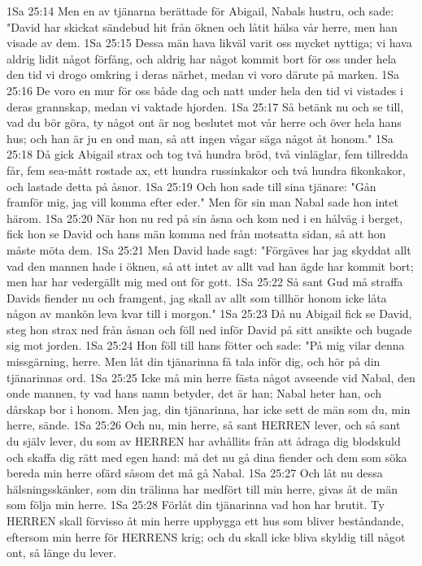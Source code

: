 1Sa 25:14  Men en av tjänarna berättade för Abigail, Nabals hustru, och sade: "David har skickat sändebud hit från öknen och låtit hälsa vår herre, men han visade av dem.
1Sa 25:15  Dessa män hava likväl varit oss mycket nyttiga; vi hava aldrig lidit något förfång, och aldrig har något kommit bort för oss under hela den tid vi drogo omkring i deras närhet, medan vi voro därute på marken.
1Sa 25:16  De voro en mur för oss både dag och natt under hela den tid vi vistades i deras grannskap, medan vi vaktade hjorden.
1Sa 25:17  Så betänk nu och se till, vad du bör göra, ty något ont är nog beslutet mot vår herre och över hela hans hus; och han är ju en ond man, så att ingen vågar säga något åt honom."
1Sa 25:18  Då gick Abigail strax och tog två hundra bröd, två vinläglar, fem tillredda får, fem sea-mått rostade ax, ett hundra russinkakor och två hundra fikonkakor, och lastade detta på åsnor.
1Sa 25:19  Och hon sade till sina tjänare: "Gån framför mig, jag vill komma efter eder." Men för sin man Nabal sade hon intet härom.
1Sa 25:20  När hon nu red på sin åsna och kom ned i en hålväg i berget, fick hon se David och hans män komma ned från motsatta sidan, så att hon måste möta dem.
1Sa 25:21  Men David hade sagt: "Förgäves har jag skyddat allt vad den mannen hade i öknen, så att intet av allt vad han ägde har kommit bort; men har har vedergällt mig med ont för gott.
1Sa 25:22  Så sant Gud må straffa Davids fiender nu och framgent, jag skall av allt som tillhör honom icke låta någon av mankön leva kvar till i morgon."
1Sa 25:23  Då nu Abigail fick se David, steg hon strax ned från åsnan och föll ned inför David på sitt ansikte och bugade sig mot jorden.
1Sa 25:24  Hon föll till hans fötter och sade: "På mig vilar denna missgärning, herre. Men låt din tjänarinna få tala inför dig, och hör på din tjänarinnas ord.
1Sa 25:25  Icke må min herre fästa något avseende vid Nabal, den onde mannen, ty vad hans namn betyder, det är han; Nabal heter han, och dårskap bor i honom. Men jag, din tjänarinna, har icke sett de män som du, min herre, sände.
1Sa 25:26  Och nu, min herre, så sant HERREN lever, och så sant du själv lever, du som av HERREN har avhållits från att ådraga dig blodskuld och skaffa dig rätt med egen hand: må det nu gå dina fiender och dem som söka bereda min herre ofärd såsom det må gå Nabal.
1Sa 25:27  Och låt nu dessa hälsningsskänker, som din trälinna har medfört till min herre, givas åt de män som följa min herre.
1Sa 25:28  Förlåt din tjänarinna vad hon har brutit. Ty HERREN skall förvisso åt min herre uppbygga ett hus som bliver beståndande, eftersom min herre för HERRENS krig; och du skall icke bliva skyldig till något ont, så länge du lever.
